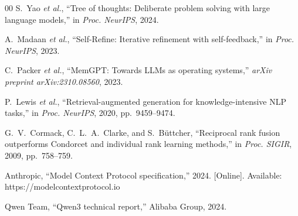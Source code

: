\documentclass[conference]{IEEEtran}
\begin{document}
\begin{thebibliography}{00}
S.~Yao \textit{et al.}, ``Tree of thoughts: Deliberate problem solving with large language models,'' in \textit{Proc. NeurIPS}, 2024.

A.~Madaan \textit{et al.}, ``Self-Refine: Iterative refinement with self-feedback,'' in \textit{Proc. NeurIPS}, 2023.

C.~Packer \textit{et al.}, ``MemGPT: Towards LLMs as operating systems,'' \textit{arXiv preprint arXiv:2310.08560}, 2023.

P.~Lewis \textit{et al.}, ``Retrieval-augmented generation for knowledge-intensive NLP tasks,'' in \textit{Proc. NeurIPS}, 2020, pp.~9459--9474.

G.~V.~Cormack, C.~L.~A.~Clarke, and S.~B{\"u}ttcher, ``Reciprocal rank fusion outperforms Condorcet and individual rank learning methods,'' in \textit{Proc. SIGIR}, 2009, pp.~758--759.

Anthropic, ``Model Context Protocol specification,'' 2024. [Online]. Available: https://modelcontextprotocol.io

Qwen Team, ``Qwen3 technical report,'' Alibaba Group, 2024.

\end{thebibliography}
\end{document}
